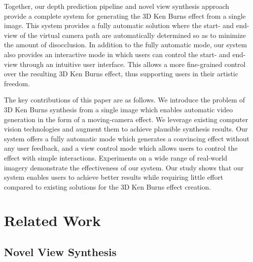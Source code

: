 \documentclass[acmtog,authorversion]{acmart}
\begin{document}
Together, our depth prediction pipeline and novel view synthesis approach provide a complete system for generating the 3D Ken Burns effect from a single image. This system provides a fully automatic solution where the start- and end-view of the virtual camera path are automatically determined so as to minimize the amount of disocclusion. In addition to the fully automatic mode, our system also provides an interactive mode in which users can control the start- and end-view through an intuitive user interface. This allows a more fine-grained control over the resulting 3D Ken Burns effect, thus supporting users in their artistic freedom.

The key contributions of this paper are as follows. We introduce the problem of 3D Ken Burns synthesis from a single image which enables automatic video generation in the form of a moving-camera effect. We leverage existing computer vision technologies and augment them to achieve plausible synthesis results. Our system offers a fully automatic mode which generates a convincing effect without any user feedback, and a view control mode which allows users to control the effect with simple interactions. Experiments on a wide range of real-world imagery demonstrate the effectiveness of our system. Our study shows that our system enables users to achieve better results while requiring little effort compared to existing solutions for the 3D Ken Burns effect creation. 
\section{Related Work}
\label{sec:related}
\subsection{Novel View Synthesis}
\end{document}
